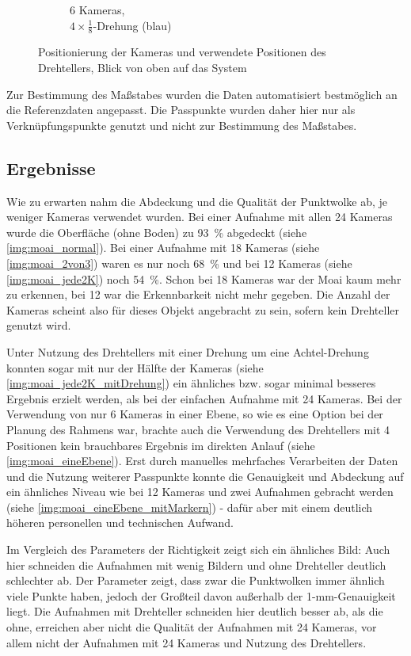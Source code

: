 \documentclass[./00PhotoBox.tex]{subfiles}
\begin{document}
\begin{figure}[bp]
\begin{subfigure}{0.48\textwidth}
        \caption{
            6 Kameras, \\
            $4 \times \frac{1}{8}$-Drehung (blau)
        }
        \label{img:kameras_ebene}
    \end{subfigure}
    \caption{Positionierung der Kameras und verwendete Positionen des Drehtellers, Blick von oben auf das System}
    \label{img:ueberblick_cam_position}
\end{figure}

Zur Bestimmung des Maßstabes wurden die Daten automatisiert bestmöglich an die Referenzdaten angepasst. Die Passpunkte wurden daher hier nur als Verknüpfungspunkte genutzt und nicht zur Bestimmung des Maßstabes.

\subsection{Ergebnisse}
Wie zu erwarten nahm die Abdeckung und die Qualität der Punktwolke ab, je weniger Kameras verwendet wurden. Bei einer Aufnahme mit allen 24 Kameras wurde die Oberfläche (ohne Boden) zu \SI{93}{\percent} abgedeckt (siehe \autoref{img:moai_normal}). Bei einer Aufnahme mit 18 Kameras (siehe \autoref{img:moai_2von3}) waren es nur noch \SI{68}{\percent} und bei 12 Kameras (siehe \autoref{img:moai_jede2K}) noch \SI{54}{\percent}.  Schon bei 18 Kameras war der Moai kaum mehr zu erkennen, bei 12 war die Erkennbarkeit nicht mehr gegeben. Die Anzahl der Kameras scheint also für dieses Objekt angebracht zu sein, sofern kein Drehteller genutzt wird.

Unter Nutzung des Drehtellers mit einer Drehung um eine Achtel-Drehung konnten sogar mit nur der Hälfte der Kameras (siehe \autoref{img:moai_jede2K_mitDrehung}) ein ähnliches bzw. sogar minimal besseres Ergebnis erzielt werden, als bei der einfachen Aufnahme mit 24 Kameras. Bei der Verwendung von nur 6 Kameras in einer Ebene, so wie es eine Option bei der Planung des Rahmens war, brachte auch die Verwendung des Drehtellers mit 4 Positionen kein brauchbares Ergebnis im direkten Anlauf (siehe \autoref{img:moai_eineEbene}). Erst durch manuelles mehrfaches Verarbeiten der Daten und die Nutzung weiterer Passpunkte konnte die Genauigkeit und Abdeckung auf ein ähnliches Niveau wie bei 12 Kameras und zwei Aufnahmen gebracht werden (siehe \autoref{img:moai_eineEbene_mitMarkern}) - dafür aber mit einem deutlich höheren personellen und technischen Aufwand.

Im Vergleich des Parameters der Richtigkeit zeigt sich ein ähnliches Bild: Auch hier schneiden die Aufnahmen mit wenig Bildern und ohne Drehteller deutlich schlechter ab. Der Parameter zeigt, dass zwar die Punktwolken immer ähnlich viele Punkte haben, jedoch der Großteil davon außerhalb der 1-mm-Genauigkeit liegt. Die Aufnahmen mit Drehteller schneiden hier deutlich besser ab, als die ohne, erreichen aber nicht die Qualität der Aufnahmen mit 24 Kameras, vor allem nicht der Aufnahmen mit 24 Kameras und Nutzung des Drehtellers.
\end{document}
